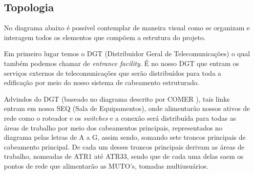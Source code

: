 \documentclass[	DIV=calc,%
							paper=a4,%
							fontsize=12pt,%
							onecolumn]{scrartcl}	 					%
\begin{document}
\clearpage
{}
\recalctypearea

\subsection{Topologia}

No diagrama abaixo é possível contemplar de maneira visual como se organizam e interagem todos os elementos que compõem a estrutura do projeto.\par
Em primeiro lugar temos o DGT (Distribuidor Geral de Telecomunicações) o qual também podemos chamar de \textit{entrance facility}. É no nosso DGT que entram os serviços externos de telecomunicações que serão distribuídos para toda a edificação por meio do nosso sistema de cabeamento estruturado.\par
Advindos do DGT (baseado no diagrama descrito por COMER \cite{COMER}), tais links entram em nossa SEQ (Sala de Equipamentos), onde alimentarão nossos ativos de rede como o roteador e os \textit{switches} e a conexão será distribuída para todas as áreas de trabalho por meio dos cabeamentos principais, representados no diagrama pelas letras de A a G, assim sendo, somando sete troncos principais de cabeamento principal. De cada um desses troncos principais derivam as áreas de trabalho, nomeadas de ATR1 até ATR33, sendo que de cada uma delas saem os pontos de rede que alimentarão as MUTO’s, tomadas multiusuários.
\end{document}
